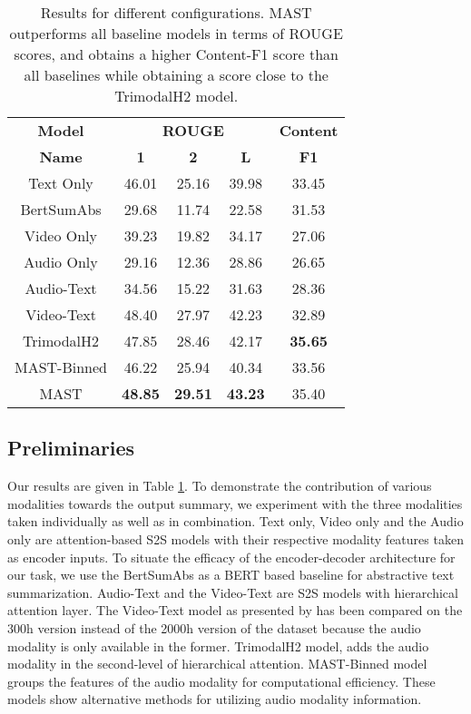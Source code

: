 \documentclass[11pt,a4paper]{article}
\begin{document}
\begin{table}[!htbp]
    \centering
    \footnotesize
    \begin{tabular}{|c|c|c|c|c|}
        \hline
        \textbf{Model} & \multicolumn{3}{|c|}{\textbf{ROUGE}} & \textbf{Content}\\
\cline{2-4}
        \textbf{Name} & \textbf{1} & \textbf{2} & \textbf{L} & \textbf{F1} \\
        \hline
        Text Only & 46.01 & 25.16 & 39.98 & 33.45 \\
        BertSumAbs & 29.68 & 11.74 & 22.58 & 31.53 \\
        Video Only & 39.23 & 19.82 & 34.17 & 27.06 \\
        Audio Only & 29.16 & 12.36 & 28.86 & 26.65 \\
        Audio-Text & 34.56 & 15.22 & 31.63 & 28.36 \\
        Video-Text & 48.40 & 27.97 & 42.23 & 32.89 \\
        TrimodalH2 & 47.85 & 28.46 & 42.17 & \textbf{35.65} \\
        MAST-Binned & 46.22 & 25.94 & 40.34 & 33.56 \\
        MAST & \textbf{48.85} & \textbf{29.51} & \textbf{43.23} & 35.40 \\
        \hline
    \end{tabular}
    \caption{Results for different configurations. MAST outperforms all baseline models in terms of ROUGE scores, and obtains a higher Content-F1 score than all baselines while obtaining a score close to the TrimodalH2 model.}
    \label{tab:results}
    \vspace{-3.5mm}
 \end{table}

\subsection{Preliminaries}
Our results are given in Table \ref{tab:results}. To demonstrate the contribution of various modalities towards the output summary, we experiment with the three modalities taken individually as well as in combination. Text only, Video only and the Audio only are attention-based S2S models \cite{bahdanau2014neural} with their respective modality features taken as encoder inputs. To situate the efficacy of the encoder-decoder architecture for our task, we use the BertSumAbs \cite{liu2019text} as a BERT based baseline for abstractive text summarization. Audio-Text and the Video-Text are S2S models with hierarchical attention layer. The Video-Text model as presented by \citet{palaskar2019multimodal} has been compared on the 300h version instead of the 2000h version of the dataset because the audio modality is only available in the former. TrimodalH2 model, adds the audio modality in the second-level of hierarchical attention. MAST-Binned model groups the features of the audio modality for computational efficiency. These models show alternative methods for utilizing audio modality information.
\end{document}

